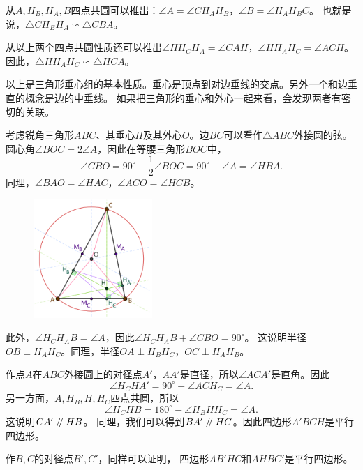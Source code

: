 \documentclass[12pt,UTF8]{ctexbook}
\renewcommand\parallel{\mathrel{/\mskip-4mu/}}
\begin{document}
从$A, H_B, H_A, B$四点共圆可以推出：$\angle A = \angle CH_AH_B$，$\angle B = \angle H_AH_BC$。
也就是说，$\triangle CH_BH_A \backsim \triangle CBA$。

从以上两个四点共圆性质还可以推出$\angle HH_CH_A = \angle CAH$，$\angle HH_AH_C = \angle ACH$。
因此，$\triangle HH_AH_C \backsim \triangle HCA$。

以上是三角形垂心组的基本性质。垂心是顶点到对边垂线的交点。另外一个和边垂直的概念是边的中垂线。
如果把三角形的垂心和外心一起来看，会发现两者有密切的关联。

考虑锐角三角形$ABC$、其垂心$H$及其外心$O$。边$BC$可以看作$\triangle ABC$外接圆的弦。
圆心角$\angle BOC = 2\angle A$，因此在等腰三角形$BOC$中，
$$\angle CBO = 90^\circ - \frac{1}{2}\angle BOC = 90^\circ - \angle A = \angle HBA.$$
同理，$\angle BAO = \angle HAC$，$\angle ACO = \angle HCB$。

\begin{figure} %
    \vspace{-50pt}
    \flushright
    \includegraphics[width=0.4\textwidth]{垂心与外心2.png}
\end{figure}

此外，$\angle H_CH_AB = \angle A$，因此$\angle H_CH_AB + \angle CBO = 90^\circ$。
这说明半径$OB \perp H_AH_C$。同理，半径$OA \perp H_BH_C$，$OC \perp H_AH_B$。

作点$A$在$ABC$外接圆上的对径点$A'$，$AA'$是直径，所以$\angle ACA'$是直角。因此
$$ \angle H_CHA' = 90^\circ - \angle ACH_C = \angle A.$$
另一方面，$A, H_B, H, H_C$四点共圆，所以
$$ \angle H_CHB = 180^\circ - \angle H_BHH_C = \angle A.$$
这说明$CA' \parallel HB$。
同理，我们可以得到$BA' \parallel HC$。因此四边形$A'BCH$是平行四边形。

作$B,C$的对径点$B', C'$，同样可以证明，
四边形$AB'HC$和$AHBC'$是平行四边形。
\end{document}
